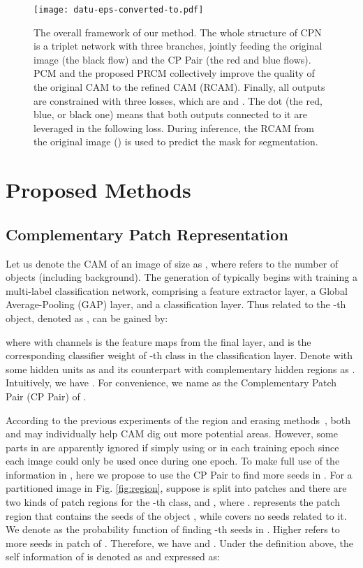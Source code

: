 \documentclass[10pt,twocolumn,letterpaper]{article}
\begin{document}
\begin{figure*}
\begin{center}
\texttt{[image: datu-eps-converted-to.pdf]}
\end{center}
\vspace{-4mm}
   \caption{The overall framework of our method. The whole structure of CPN is a triplet network with three branches, jointly feeding the original image (the black flow) and the CP Pair (the red and blue flows). PCM and the proposed PRCM collectively improve the quality of the original CAM to the refined CAM (RCAM). Finally, all outputs are constrained with three losses, which are  and . The dot (the red, blue, or black one) means that both outputs connected to it are leveraged in the following loss. During inference, the RCAM from the original image () is used to predict the mask for segmentation. }
\label{fig:datu}
\end{figure*}
\section{Proposed Methods}
\subsection{Complementary Patch Representation}\label{CPR}
Let us denote the CAM of an image  of size  as , where  refers to the number of objects (including background). The generation of  typically begins with training a multi-label classification network, comprising a feature extractor layer, a Global Average-Pooling (GAP) layer, and a classification layer. Thus  related to the -th object, denoted as , can be gained by:

where  with  channels is the feature maps from the final layer, and  is the corresponding classifier weight of -th class in the classification layer. Denote  with some hidden units as  and its counterpart with complementary hidden regions as . Intuitively, we have . For convenience, we name  as the Complementary Patch Pair (CP Pair) of .

According to the previous experiments of the region and erasing methods~\cite{has,erase1}, both  and  may individually help CAM dig out more potential areas. However, some parts in  are apparently ignored if simply using  or  in each training epoch since each image could only be used once during one epoch. To make full use of the information in , here we propose to use the CP Pair to find more seeds in .
For a partitioned image in Fig. \ref{fig:region}, suppose  is split into  patches and there are two kinds of patch regions for the -th class,  and , where .  represents the patch region that contains the seeds of the object , while  covers no seeds related to it. We denote  as the probability function of finding -th seeds in . Higher  refers to more seeds in patch  of . Therefore, we have  and . Under the definition above, the self information of  is denoted as  and expressed as:
\end{document}
